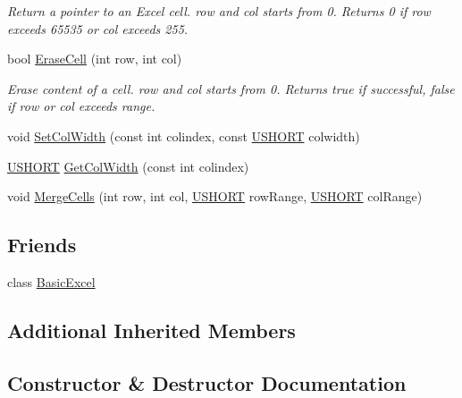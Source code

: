 \begin{DoxyCompactItemize}
\begin{DoxyCompactList}\small\item\em Return a pointer to an Excel cell. row and col starts from 0. Returns 0 if row exceeds 65535 or col exceeds 255. \end{DoxyCompactList}\item 
bool \hyperlink{class_y_excel_1_1_basic_excel_worksheet_a60a1ac663ba3bc3aa9668db035fa750c}{Erase\+Cell} (int row, int col)
\begin{DoxyCompactList}\small\item\em Erase content of a cell. row and col starts from 0. Returns true if successful, false if row or col exceeds range. \end{DoxyCompactList}\item 
void \hyperlink{class_y_excel_1_1_basic_excel_worksheet_aa6622d706fc57b443aa658ea06aee080}{Set\+Col\+Width} (const int colindex, const \hyperlink{_basic_excel_8hpp_a5850d5316caf7f4cedd742fdf8cd7c02}{U\+S\+H\+O\+R\+T} colwidth)
\item 
\hyperlink{_basic_excel_8hpp_a5850d5316caf7f4cedd742fdf8cd7c02}{U\+S\+H\+O\+R\+T} \hyperlink{class_y_excel_1_1_basic_excel_worksheet_a301a34eb141164d9d96046308b29e273}{Get\+Col\+Width} (const int colindex)
\item 
void \hyperlink{class_y_excel_1_1_basic_excel_worksheet_a88827fd80b0b55be52824d3e191b51cc}{Merge\+Cells} (int row, int col, \hyperlink{_basic_excel_8hpp_a5850d5316caf7f4cedd742fdf8cd7c02}{U\+S\+H\+O\+R\+T} row\+Range, \hyperlink{_basic_excel_8hpp_a5850d5316caf7f4cedd742fdf8cd7c02}{U\+S\+H\+O\+R\+T} col\+Range)
\end{DoxyCompactItemize}
\subsection*{Friends}
\begin{DoxyCompactItemize}
\item 
class \hyperlink{class_y_excel_1_1_basic_excel_worksheet_a6c5913fd086d459fd698f3123c8d001c}{Basic\+Excel}
\end{DoxyCompactItemize}
\subsection*{Additional Inherited Members}


\subsection{Constructor \& Destructor Documentation}
\hypertarget{class_y_excel_1_1_basic_excel_worksheet_a5b2b6fc3712e8e8742336ea058dc5a9c}{}
